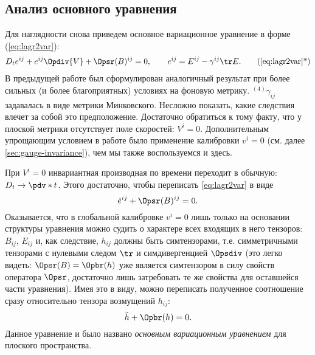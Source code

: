 \documentclass[\docroot/reports/draft/report.tex]{subfiles}
\begin{document}
\subsection{Анализ основного уравнения}\label{sec:eq-analyze}

    Для наглядности снова приведем основное вариационное уравнение в форме (\ref{eq:lagr2var}):
    \begin{equation*}\begin{aligned}
        D_t{e^{ij}} + e^{ij} \Opdiv{V} + \Opsr(B)^{ij} = 0, \qquad e^{ij} = E^{ij} - \gamma^{ij} \tr E .
    \end{aligned}\tag{\ref{eq:lagr2var}*}\end{equation*}
    В предыдущей работе \cite{Vas2018b} был сформулирован аналогичный результат при более сильных (и более благоприятных) условиях на фоновую метрику. ${}^{(4)}\gamma_{ij}$ задавалась в виде метрики Минковского. Несложно показать, какие следствия влечет за собой это предположение. Достаточно обратиться к тому факту, что у плоской метрики отсутствует поле скоростей: $V^i = 0$. Дополнительным упрощающим условием в работе было применение калибровки $v^i = 0$ (см. далее \autoref{sec:gauge-invariance}), чем мы также воспользуемся и здесь.

    При $V^i = 0$ инвариантная производная по времени переходит в обычную: $D_t \to \pdv*{t}$. Этого достаточно, чтобы переписать \autoref{eq:lagr2var} в виде
    \begin{equation*}
        \dot{e}^{ij} + \Opsr(B)^{ij} = 0 .
    \end{equation*}
    Оказывается, что в глобальной калибровке $v^i = 0$ лишь только на основании структуры уравнения можно судить о характере всех входящих в него тензоров: $B_{ij}$, $E_{ij}$ и, как следствие, $h_{ij}$ должны быть симтензорами, т.е. симметричными тензорами с нулевыми следом $\tr$ и симдивергенцией $\Opsdiv$ (это легко видеть: $\Opsr(B) = \Opbr(h)$ уже является симтензором в силу свойств оператора $\Opsr$, достаточно лишь затребовать те же свойства для оставшейся части уравнения). Имея это в виду, можно переписать полученное соотношение сразу относительно тензора возмущений $h_{ij}$:
    \begin{equation}\label{eq:lagr2var-noV}
        \ddot{h} + \Opbr(h) = 0 .
    \end{equation}
    Данное уравнение и было названо \textit{основным вариационным уравнением} для плоского пространства.
\end{document}
